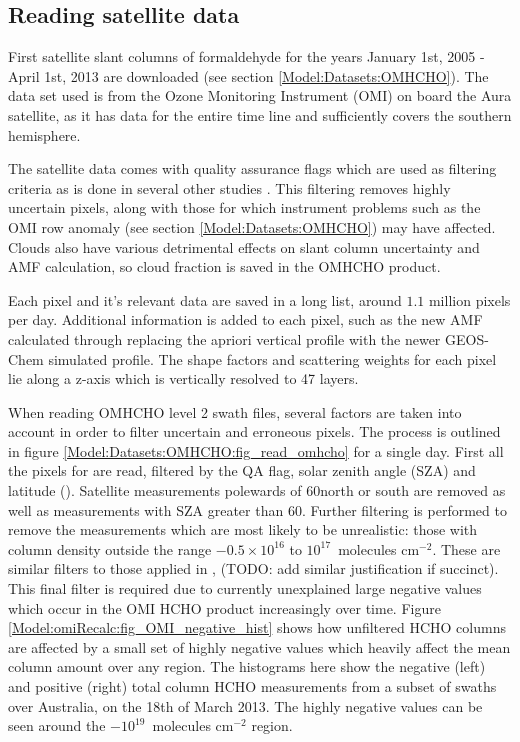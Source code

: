   \subsection{Reading satellite data}
    
    First satellite slant columns of formaldehyde for the years January 1st, 2005 - April 1st, 2013 are downloaded (see section \ref{Model:Datasets:OMHCHO}).
    The data set used is from the Ozone Monitoring Instrument (OMI) on board the Aura satellite, as it has data for the entire time line and sufficiently covers the southern hemisphere.
    
    The satellite data comes with quality assurance flags which are used as filtering criteria as is done in several other studies \citep[eg.]{Marais2012, Barkley2013, Bauwens2016, Zhu2016}.
    This filtering removes highly uncertain pixels, along with those for which instrument problems such as the OMI row anomaly (see section \ref{Model:Datasets:OMHCHO}) may have affected.
    Clouds also have various detrimental effects on slant column uncertainty and AMF calculation, so cloud fraction is saved in the OMHCHO product.
    
    Each pixel and it's relevant data are saved in a long list, around $1.1$ million pixels per day.
    Additional information is added to each pixel, such as the new AMF calculated through replacing the apriori vertical profile with the newer GEOS-Chem simulated profile.
    The shape factors and scattering weights for each pixel lie along a z-axis which is vertically resolved to 47 layers.
    
    When reading OMHCHO level 2 swath files, several factors are taken into account in order to filter uncertain and erroneous pixels.
    The process is outlined in figure  \ref{Model:Datasets:OMHCHO:fig_read_omhcho} for a single day.
    First all the pixels for are read, filtered by the QA flag, solar zenith angle (SZA) and latitude (\textcite{Palmer2001}).
    Satellite measurements polewards of 60\degr north or south are removed as well as measurements with SZA greater than 60\degr.
    Further filtering is performed to remove the measurements which are most likely to be unrealistic: those with column density outside the range $-0.5 \times 10^{16}$ to $10^{17} $~molecules cm$^{-2}$.
    These are similar filters to those applied in \textcite{Zhu2016}, (TODO: add similar justification if succinct).
    This final filter is required due to currently unexplained large negative values which occur in the OMI HCHO product increasingly over time.
    Figure \ref{Model:omiRecalc:fig_OMI_negative_hist} shows how unfiltered HCHO columns are affected by a small set of highly negative values which heavily affect the mean column amount over any region.
    The histograms here show the negative (left) and positive (right) total column HCHO measurements from a subset of swaths over Australia, on the 18th of March 2013.
    The highly negative values can be seen around the $-10^{19}$~molecules cm$^{-2}$ region.
    
